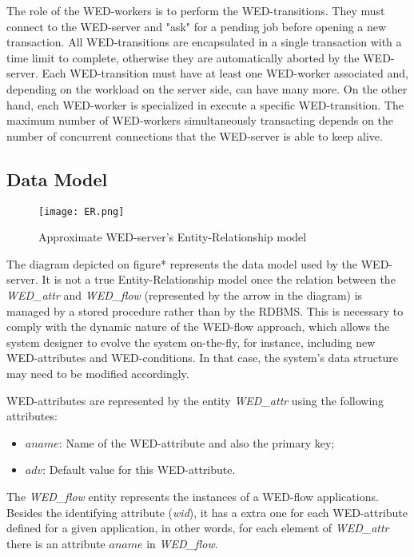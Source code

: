 \documentclass[12pt]{article}
\begin{document}
\par The role of the WED-workers is to perform the WED-transitions. They must connect to the WED-server and "ask" for a pending
job before opening a new transaction. All WED-transitions are encapsulated in a single transaction with a time limit to 
complete, otherwise they are automatically aborted by the WED-server. Each WED-transition must have at least one WED-worker
associated and, depending on the workload on the server side, can have many more. On the other hand, each WED-worker is 
specialized in execute a specific WED-transition. The maximum number of WED-workers simultaneously transacting depends 
on the number of concurrent connections that the WED-server is able to keep alive.

\subsection{Data Model}

\begin{figure}[!t]
\centering
\texttt{[image: ER.png]}
\caption{Approximate WED-server's Entity-Relationship model}
\label{fig_er}

\end{figure}
 The diagram depicted on figure* represents the data model used by the WED-server. It is not a true Entity-Relationship 
model once the relation between the \emph{WED\_attr} and \emph{WED\_flow} (represented by the arrow in the diagram) is 
managed by a stored procedure rather than by the RDBMS. This is necessary to comply with the dynamic nature of the WED-flow 
approach, which allows the system designer to evolve the system on-the-fly, for instance, including new WED-attributes and 
WED-conditions. In that case, the system's data structure may need to be modified accordingly. 

\par WED-attributes are represented by the entity \emph{WED\_attr} using the following attributes:
\begin{itemize}
\item $aname$: Name of the WED-attribute and also the primary key;
\item $adv$: Default value for this WED-attribute.
\end{itemize}

The \emph{WED\_flow} entity represents the instances of a WED-flow applications. Besides the identifying attribute (\emph{wid}),
it has a extra one for each WED-attribute defined for a given application, in other words, for each element of \emph{WED\_attr}
there is an attribute $aname$ in \emph{WED\_flow}.
\end{document}
